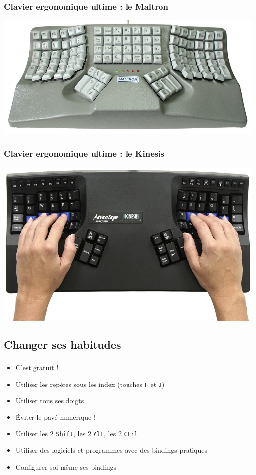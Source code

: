 \documentclass[c,12pt]{beamer}
\begin{document}
\begin{frame}
	\frametitle{Clavier ergonomique ultime : le Maltron}
	\begin{center}
		\includegraphics[scale=0.35]{maltron.jpg}
	\end{center}
\end{frame}

\begin{frame}
	\frametitle{Clavier ergonomique ultime : le Kinesis}
	\begin{center}
		\includegraphics[scale=0.35]{kinesis.jpg}
	\end{center}
\end{frame}

\subsection{Changer ses habitudes}

\begin{frame}
	\frametitle{\subsecname}
	\begin{itemize}
		\item<1->{C'est gratuit !}
		\item<2->{Utiliser les repères sous les index (touches \texttt{F} et
			\texttt{J})}
		\item<3->{Utiliser tous ses doigts}
		\item<4->{Éviter le pavé numérique !}
		\item<5->{Utiliser les 2 \texttt{Shift}, les 2 \texttt{Alt}, les 2
			\texttt{Ctrl}}
		\item<6->{Utiliser des logiciels et programmes avec des bindings pratiques}
		\item<7->{Configurer soi-même ses bindings}
	\end{itemize}
\end{frame}
\end{document}

